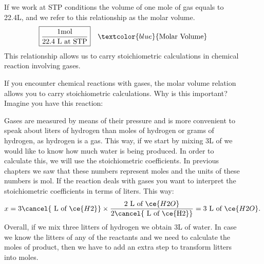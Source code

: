 \documentclass[main.tex]{subfiles}
\begin{document}
\sloppy 
\begin{description}
\item[] 
If we work at STP conditions the volume of one mole of gas equals to 22.4L, and we refer to this relationship as the molar volume.%
\begin{equation*}
\boxed{  \frac{1 \text{mol}} {22.4\text{ L at STP}} } \quad \textcolor{blue}{\text{Molar Volume}}
\end{equation*}
This relationship allows us to carry stoichiometric calculations in chemical reaction involving gases.


\item[] If you encounter chemical reactions with gases, the molar volume relation allows you to carry stoichiometric calculations. Why is this important? Imagine you have this reaction:
\begin{center} \end{center}
Gases are measured by means of their pressure and is more convenient to speak about liters of hydrogen than moles of hydrogen or grams of hydrogen, as hydrogen is a gas. This way, if we start by mixing 3L of  we would like to know how much water is being produced. In order to calculate this, we will use the stoichiometric coefficients. In previous chapters we saw that these numbers represent moles and the units of these numbers is mol. If the reaction deals with gases you want to interpret the stoichiometric coefficients in terms of liters. This way:
\begin{equation*}
x=3\cancel{\text{ L of }\ce{H2}} \times \dfrac{\text{2 L of }\ce{H2O}}{2\cancel{\text{ L of \ce{H2}}}}=3\text{ L of }\ce{H2O}.
\end{equation*}
Overall, if we mix three litters of hydrogen we obtain 3L of water.
In case we know the litters of any of the reactants and we need to calculate the moles of product, then we have to add an extra step to transform litters into moles.



\end{description}
\end{document}
